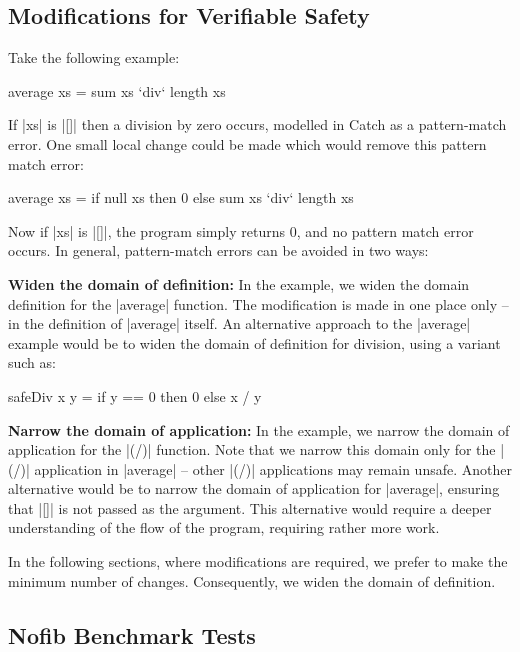 \documentclass[preprint]{sigplanconf}
\newcommand{\para}[1]{\vspace{2mm}\noindent\textbf{#1}}
\begin{document}
\subsection{Modifications for Verifiable Safety}
\label{sec:safety}

Take the following example:

\begin{code}
average xs = sum xs `div` length xs
\end{code}

If |xs| is |[]| then a division by zero occurs, modelled in Catch as a pattern-match error. One small local change could be made which would remove this pattern match error:

\begin{code}
average xs = if null xs then 0 else sum xs `div` length xs
\end{code}

\noindent Now if |xs| is |[]|, the program simply returns 0, and no pattern match error occurs. In general, pattern-match errors can be avoided in two ways:

\para{Widen the domain of definition:} In the example, we widen the domain definition for the |average| function. The modification is made in one place only -- in the definition of |average| itself. An alternative approach to the |average| example would be to widen the domain of definition for division, using a variant such as:

\begin{code}
safeDiv x y = if y == 0 then 0 else x / y
\end{code}


\para{Narrow the domain of application:} In the example, we narrow the domain of application for the |(/)| function.  Note that we narrow this domain only for the |(/)| application in |average| -- other |(/)| applications may remain unsafe. Another alternative would be to narrow the domain of application for |average|, ensuring that |[]| is not passed as the argument. This alternative would require a deeper understanding of the flow of the program, requiring rather more work.

In the following sections, where modifications are required, we prefer to make the minimum number of changes. Consequently, we widen the domain of definition.

\subsection{Nofib Benchmark Tests}
\label{sec:imaginary}
\end{document}
